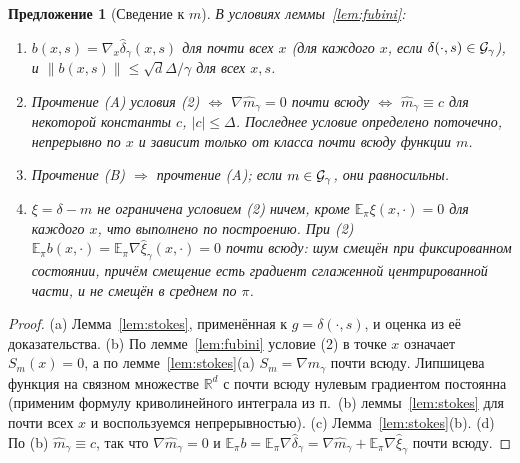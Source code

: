 \documentclass[11pt,a4paper]{article}
\numberwithin{equation}{section}
\newtheorem{proposition}[theorem]{Предложение}
\theoremstyle{definition}
\theoremstyle{remark}
\newcommand{\E}{\mathbb E}\newcommand{\R}{\mathbb R}\newcommand{\N}{\mathbb N}\let\Prob\relax\newcommand{\Prob}{\mathbb P}
\newcommand{\norm}[1]{\lVert #1\rVert}\newcommand{\abs}[1]{\lvert #1\rvert}\newcommand{\ip}[2]{\langle #1,#2\rangle}
\begin{document}
\begin{proposition}[Сведение к $m$]\label{prop:reduction}
В условиях леммы~\ref{lem:fubini}:
\begin{enumerate}[label=(\alph*)]
\item $b(x,s)=\nabla_x\hat\delta_\gamma(x,s)$ для почти всех $x$ (для каждого $x$, если $\delta(\cdot,s)\in\mathcal G_\gamma$), и $\norm{b(x,s)}\le\sqrt d\Delta/\gamma$ для всех $x,s$.
\item Прочтение (A) условия (2) $\iff$ $\nabla\hat m_\gamma=0$ почти всюду $\iff$ $\hat m_\gamma\equiv c$ для некоторой константы $c$, $\abs c\le\Delta$. Последнее условие определено поточечно, непрерывно по $x$ и зависит только от класса почти всюду функции $m$.
\item Прочтение (B) $\Rightarrow$ прочтение (A); если $m\in\mathcal G_\gamma$, они равносильны.
\item $\xi=\delta-m$ не ограничена условием (2) ничем, кроме $\E_\pi\xi(x,\cdot)=0$ для каждого $x$, что выполнено по построению. При (2) $\E_\pi b(x,\cdot)=\E_\pi\nabla\hat\xi_\gamma(x,\cdot)=0$ почти всюду: шум смещён при фиксированном состоянии, причём смещение есть градиент сглаженной центрированной части, и не смещён в среднем по $\pi$.
\end{enumerate}
\end{proposition}
\begin{proof}
(a) Лемма~\ref{lem:stokes}, применённая к $g=\delta(\cdot,s)$, и оценка из её доказательства. (b) По лемме~\ref{lem:fubini} условие (2) в точке $x$ означает $S_m(x)=0$, а по лемме~\ref{lem:stokes}(a) $S_m=\nabla\hat m_\gamma$ почти всюду. Липшицева функция на связном множестве $\R^d$ с почти всюду нулевым градиентом постоянна (применим формулу криволинейного интеграла из п.~(b) леммы~\ref{lem:stokes} для почти всех $x$ и воспользуемся непрерывностью). (c) Лемма~\ref{lem:stokes}(b). (d) По (b) $\hat m_\gamma\equiv c$, так что $\nabla\hat m_\gamma=0$ и $\E_\pi b=\E_\pi\nabla\hat\delta_\gamma=\nabla\hat m_\gamma+\E_\pi\nabla\hat\xi_\gamma$ почти всюду.
\end{proof}
\end{document}

